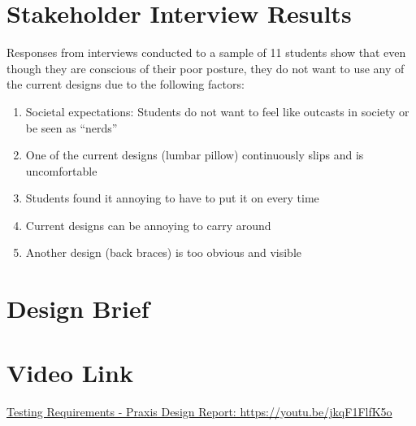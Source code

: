 \documentclass[11pt]{article}
\begin{document}

\begin{appendices}
\section{Stakeholder Interview Results}
Responses from interviews conducted to a sample of 11 students show that even though they are conscious of their poor posture, they do not want to use any of the current designs due to the following factors: 
\begin{enumerate}
\item Societal expectations: Students do not want to feel like outcasts in society or be seen as “nerds” 
\item One of the current designs (lumbar pillow) continuously slips and is uncomfortable 
\item Students found it annoying to have to put it on every time 
\item Current designs can be annoying to carry around 
\item Another design (back braces) is too obvious and visible 
\end{enumerate}
\label{appendix:inteviews}
\section{Design Brief}

\label{appendix:designBrief}
\section{Video Link}
\href{https://youtu.be/jkqF1FlfK5o}{Testing Requirements - Praxis Design Report: https://youtu.be/jkqF1FlfK5o}
\end{appendices}
\end{document}
